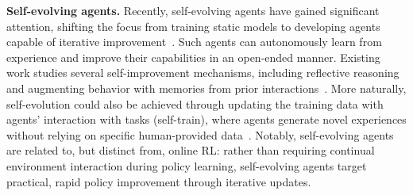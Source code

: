 \documentclass{article}
\theoremstyle{plain}
\theoremstyle{definition}
\theoremstyle{remark}
\begin{document}

\textbf{Self-evolving agents.} Recently, self-evolving agents have gained significant attention, shifting the focus from training static models to developing agents capable of iterative improvement~\citep{gao2026survey}. Such agents can autonomously learn from experience and improve their capabilities in an open-ended manner. Existing work studies several self-improvement mechanisms, including reflective reasoning and augmenting behavior with memories from prior interactions~\citep{ouyang2025reasoningbankscalingagentselfevolving,qian2024investigate, liang2024self,guan2024richelieu}. More naturally, self-evolution could also be achieved through updating the training data with agents' interaction with tasks (self-train), where agents generate novel experiences without relying on specific human-provided data~\citep{dou2024re,guo2025seagent, qiwebrl, sun2025seagent}. Notably, self-evolving agents are related to, but distinct from, online RL: rather than requiring continual environment interaction during policy learning, self-evolving agents target practical, rapid policy improvement through iterative updates.

\end{document}
